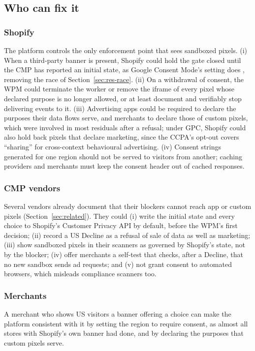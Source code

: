 \subsection{Who can fix it}\label{sec:disc-fix}

\subsubsection*{Shopify}
The platform controls the only enforcement point that sees sandboxed pixels. (i) When a third-party banner is present, Shopify could hold the gate closed until the CMP has reported an initial state, as Google Consent Mode's  setting does \citep{google_consentmode}, removing the race of Section~\ref{sec:res-race}. (ii) On a withdrawal of consent, the WPM could terminate the worker or remove the iframe of every pixel whose declared purpose is no longer allowed, or at least document and verifiably stop delivering events to it. (iii) Advertising apps could be required to declare the purposes their data flows serve, and merchants to declare those of custom pixels, which were involved in most residuals after a refusal; under GPC, Shopify could also hold back pixels that declare marketing, since the CCPA's opt-out covers ``sharing'' for cross-context behavioural advertising. (iv) Consent strings generated for one region should not be served to visitors from another; caching providers and merchants must keep the consent header out of cached responses.

\subsubsection*{CMP vendors}
Several vendors already document that their blockers cannot reach app or custom pixels (Section~\ref{sec:related}). They could (i) write the initial state and every choice to Shopify's Customer Privacy API by default, before the WPM's first decision; (ii) record a US Decline as a refusal of sale of data as well as marketing; (iii) show sandboxed pixels in their scanners as governed by Shopify's state, not by the blocker; (iv) offer merchants a self-test that checks, after a Decline, that no new sandbox sends ad requests; and (v) not grant consent to automated browsers, which misleads compliance scanners too.

\subsubsection*{Merchants}
A merchant who shows US visitors a banner offering a choice can make the platform consistent with it by setting the region to require consent, as almost all stores with Shopify's own banner had done, and by declaring the purposes that custom pixels serve.

